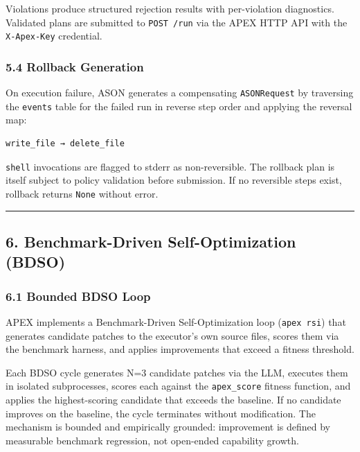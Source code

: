 Violations produce structured rejection results with per-violation
diagnostics. Validated plans are submitted to \texttt{POST\ /run} via
the APEX HTTP API with the \texttt{X-Apex-Key} credential.

\subsubsection{5.4 Rollback Generation}\label{rollback-generation}

On execution failure, ASON generates a compensating \texttt{ASONRequest}
by traversing the \texttt{events} table for the failed run in reverse
step order and applying the reversal map:

\begin{verbatim}
write_file → delete_file
\end{verbatim}

\texttt{shell} invocations are flagged to stderr as non-reversible. The
rollback plan is itself subject to policy validation before submission.
If no reversible steps exist, rollback returns \texttt{None} without
error.

\begin{center}\rule{0.5\linewidth}{0.5pt}\end{center}

\subsection{6. Benchmark-Driven Self-Optimization
(BDSO)}\label{benchmark-driven-self-optimization-bdso}

\subsubsection{6.1 Bounded BDSO Loop}\label{bounded-bdso-loop}

APEX implements a Benchmark-Driven Self-Optimization loop
(\texttt{apex\ rsi}) that generates candidate patches to the executor's
own source files, scores them via the benchmark harness, and applies
improvements that exceed a fitness threshold.

Each BDSO cycle generates N=3 candidate patches via the LLM, executes
them in isolated subprocesses, scores each against the
\texttt{apex\_score} fitness function, and applies the highest-scoring
candidate that exceeds the baseline. If no candidate improves on the
baseline, the cycle terminates without modification. The mechanism is
bounded and empirically grounded: improvement is defined by measurable
benchmark regression, not open-ended capability growth.

